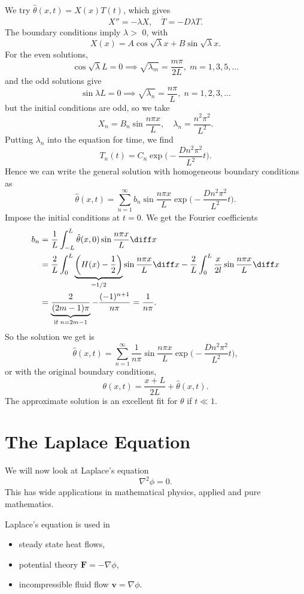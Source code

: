 \documentclass[12pt]{article}
\begin{document}
We try $\hat \theta(x, t) = X(x)T(t)$, which gives
\[
X'' = - \lambda X, \quad \dot T = - D \lambda T
.\]
The boundary conditions imply $\lambda > $ 0, with
\[
	X(x) = A \cos \sqrt \lambda x + B \sin \sqrt \lambda x
.\]
For the even solutions,
\[
	\cos \sqrt \lambda L = 0 \implies \sqrt{\lambda_m} = \frac{m \pi}{2L}, \; m = 1, 3, 5,\ldots
\]
and the odd solutions give
\[
	\sin \lambda L = 0 \implies \sqrt{\lambda_n} = \frac{n \pi}{L}, \; n = 1, 2, 3, \ldots
\]
but the initial conditions are odd, so we take
\[
X_n = B_n \sin \frac{n \pi x}{L}, \quad \lambda_n = \frac{n^2 \pi^2}{L^2}
.\]
Putting $\lambda_n$ into the equation for time, we find
\[
	T_n(t) = C_n \exp \biggl( - \frac{Dn^2\pi^2}{L^2}t \biggr)
.\]
Hence we can write the general solution with homogeneous boundary conditions as
\[
	\hat \theta(x, t) = \sum_{n = 1}^{\infty}b_n \sin \frac{n \pi x}{L} \exp \biggl( - \frac{D n^2 \pi^2}{L^2} t \biggr)
.\]
Impose the initial conditions at $t = 0$. We get the Fourier coefficients
\begin{align*}
	b_n &= \frac{1}{L} \int_{-L}^{L} \hat \theta(x, 0) \sin \frac{n \pi x}{L}\diff x \\
	    &= \frac{2}{L} \int_{0}^{L} \underbrace{\biggl(H(x) - \frac{1}{2}\biggr)}_{=1/2}\sin \frac{n \pi x}{L} \diff x - \frac{2}{L} \int_{0}^{L} \frac{x}{2l}\sin \frac{n \pi x}{L} \diff x \\
	    &= \underbrace{\frac{2}{(2m - 1)\pi}}_{\text{if }n = 2m - 1} - \frac{(-1)^{n+1}}{n \pi} = \frac{1}{n \pi}.
\end{align*}
So the solution we get is
\[
	\hat \theta(x, t) = \sum_{n = 1}^{\infty} \frac{1}{n \pi} \sin \frac{n \pi x}{L} \exp \biggl(- \frac{Dn^2\pi^2}{L^2}t \biggr)
,\]
or with the original boundary conditions,
\[
	\theta(x, t) = \frac{x+L}{2L} + \hat \theta(x, t)
.\]
The approximate solution is an excellent fit for $\theta$ if $t \ll 1$.

\newpage

\section{The Laplace Equation}%
\label{sec:the_laplace_equation}

We will now look at Laplace's equation
\[
\nabla^2 \phi = 0
.\]
This has wide applications in mathematical physics, applied and pure mathematics.

Laplace's equation is used in
\begin{itemize}
	\item steady state heat flows,
	\item potential theory $\mathbf{F} = - \nabla \phi$,
	\item incompressible fluid flow $\mathbf{v} = \nabla \phi$.
\end{itemize}
\end{document}
